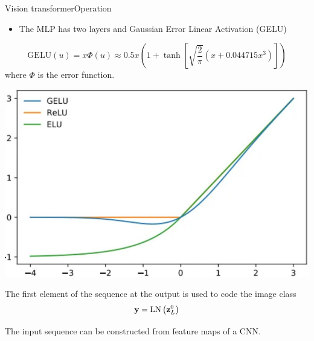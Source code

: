 \documentclass{beamer}
\begin{document}
\begin{frame}{Vision transformer}{Operation}
    \begin{itemize}
        \item The MLP has two layers and Gaussian Error Linear Activation (GELU)
        \end{itemize}
\begin{equation}
      \text{GELU}(u) =  x \varPhi(u) \approx 0.5 x\left(1 + \tanh\left[\sqrt{\frac{2}{\pi}}\left(x+0.044715x^3 \right)\right]\right)
\end{equation}
      where $\varPhi$ is the error function.


\begin{multicols}{2}
    
    \includegraphics[scale=0.3]{Module 6 (Attention-based networks)/pics/GELU.pdf}

\columnbreak

The first element of the sequence at the output is used to code the image class 
\begin{equation}
    {\bf y} = \text{LN}\left( {\bf z}_L^0 \right)
\end{equation}

\end{multicols}
The input sequence can be constructed from feature maps of a CNN.
\end{frame}
\end{document}
